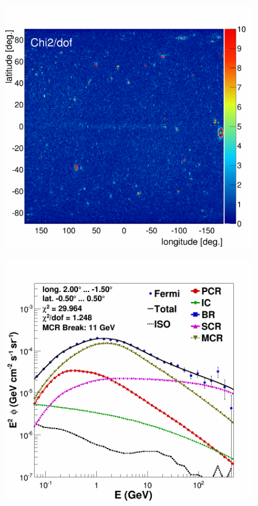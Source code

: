 \newpage
\begin{figure}[H]
  \centering
  \begin{minipage}[h]{0.45\textwidth}
  	\centering
	\includegraphics[width=1.\linewidth]{pic/results/MCRonly_fine_chi2_distribution.png}
  	\subcaption{}
  	\label{fig:MCRonly_chi2Distribution}
  \end{minipage}
  \hfill
  \begin{minipage}[h]{0.45\textwidth}
  	\centering
	\includegraphics[width=\linewidth]{pic/results/MCRonly_CMZ.png}

\end{minipage}
\end{figure}
